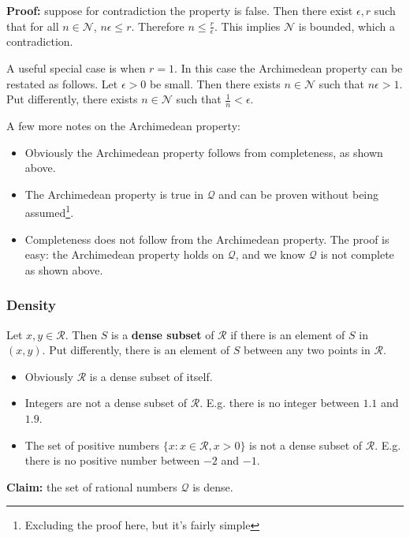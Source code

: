 \vs

\textbf{Proof:} suppose for contradiction the property is false. Then
there exist $\epsilon, r$ such that for all $n\in\mathcal{N}$, $n\epsilon\leq r$. Therefore
$n\leq\frac{r}{\epsilon}$. This implies $\mathcal{N}$ is bounded, which a contradiction.

\vs

A useful special case is when $r=1$. In this case the Archimedean
property can be restated as follows. Let $\epsilon>0$ be small. Then there
exists $n\in\mathcal{N}$ such that $n\epsilon>1$. Put differently, there exists
$n\in\mathcal{N}$ such that $\frac{1}{n}<\epsilon$.

\vs

A few more notes on the Archimedean property:
\begin{itemize}
\item Obviously the Archimedean property follows from completeness, as
  shown above.
\item The Archimedean property is true in $\mathcal{Q}$ and can be proven
  without being assumed\footnote{Excluding the proof here, but it's
    fairly simple}.
\item Completeness does not follow from the Archimedean property. The
  proof is easy: the Archimedean property holds on $\mathcal{Q}$, and we know
  $\mathcal{Q}$ is not complete as shown above.
\end{itemize}


\subsubsection*{Density}
Let $x,y\in\mathcal{R}$. Then $S$ is a \textbf{dense subset} of
$\mathcal{R}$ if there is an element of $S$ in $(x,y)$. Put differently, there
is an element of $S$ between any two points in $\mathcal{R}$.
\begin{itemize}
\item Obviously $\mathcal{R}$ is a dense subset of itself.
\item Integers are not a dense subset of $\mathcal{R}$. E.g. there is no integer
  between $1.1$ and $1.9$.
\item The set of positive numbers $\{x:x\in\mathcal{R}, x>0\}$ is not a dense
  subset of $\mathcal{R}$. E.g. there is no positive number between
  $-2$ and $-1$.
\end{itemize}

\textbf{Claim:} the set of rational numbers $\mathcal{Q}$ is dense.

